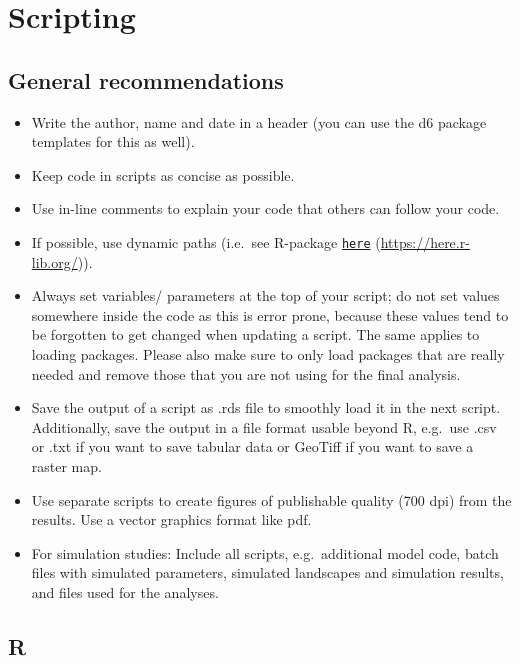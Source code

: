 \documentclass[
  english,
]{article}
\providecommand{\tightlist}{%
  \setlength{\itemsep}{0pt}\setlength{\parskip}{0pt}}
\begin{document}
\hypertarget{scripting}{%
\section{Scripting}\label{scripting}}

\hypertarget{general-recommendations}{%
\subsection{General recommendations}\label{general-recommendations}}

\begin{itemize}
\tightlist
\item
  Write the author, name and date in a header (you can use the d6
  package templates for this as well).
\item
  Keep code in scripts as concise as possible.
\item
  Use in-line comments to explain your code that others can follow your
  code.
\item
  If possible, use dynamic paths (i.e.~see R-package
  \href{https://here.r-lib.org/}{\texttt{here}}
  (\url{https://here.r-lib.org/})).
\item
  Always set variables/ parameters at the top of your script; do not set
  values somewhere inside the code as this is error prone, because these
  values tend to be forgotten to get changed when updating a script. The
  same applies to loading packages. Please also make sure to only load
  packages that are really needed and remove those that you are not
  using for the final analysis.
\item
  Save the output of a script as .rds file to smoothly load it in the
  next script. Additionally, save the output in a file format usable
  beyond R, e.g.~use .csv or .txt if you want to save tabular data or
  GeoTiff if you want to save a raster map.
\item
  Use separate scripts to create figures of publishable quality (700
  dpi) from the results. Use a vector graphics format like pdf.
\item
  For simulation studies: Include all scripts, e.g.~additional model
  code, batch files with simulated parameters, simulated landscapes and
  simulation results, and files used for the analyses.
\end{itemize}

\hypertarget{r}{%
\subsection{R}\label{r}}
\end{document}
